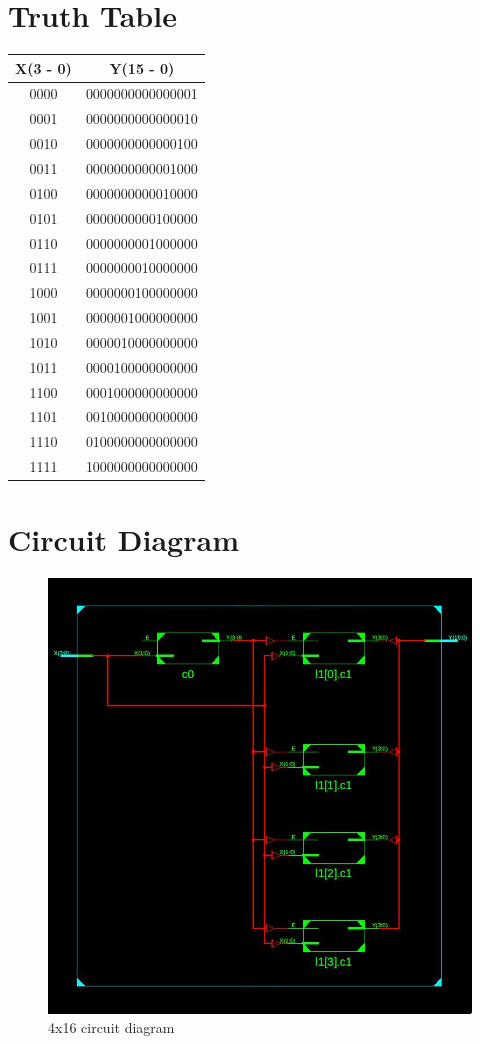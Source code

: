 \documentclass[titlepage]{article}
\begin{document}
    \section{Truth Table}
    \begin{tabular}{| c | c |}
        \hline
        X(3 - 0) & Y(15 - 0) \\
        \hline
        0000 & 0000000000000001 \\
        0001 & 0000000000000010 \\
        0010 & 0000000000000100 \\
        0011 & 0000000000001000 \\
        0100 & 0000000000010000 \\
        0101 & 0000000000100000 \\
        0110 & 0000000001000000 \\
        0111 & 0000000010000000 \\
        1000 & 0000000100000000 \\
        1001 & 0000001000000000 \\
        1010 & 0000010000000000 \\
        1011 & 0000100000000000 \\
        1100 & 0001000000000000 \\
        1101 & 0010000000000000 \\
        1110 & 0100000000000000 \\
        1111 & 1000000000000000 \\
        \hline
    \end{tabular}
    \section{Circuit Diagram}
    \begin{figure}[!ht]
        \centering
        \includegraphics[width=12cm]{./figures/4x16.jpeg}
        \caption{4x16 circuit diagram}
    \end{figure}
\end{document}
